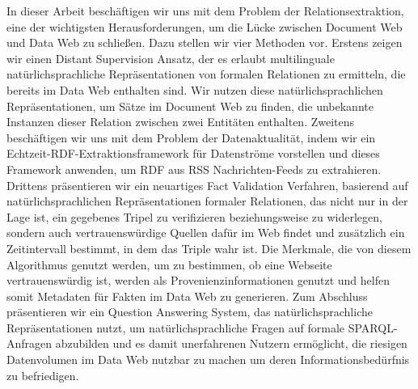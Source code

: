 In dieser Arbeit beschäftigen wir uns mit dem Problem der Relationsextraktion, eine der wichtigsten Herausforderungen, um die Lücke zwischen Document Web und Data Web zu schließen. 
Dazu stellen wir vier Methoden vor.
Erstens zeigen wir einen Distant Supervision Ansatz, der es erlaubt multilinguale natürlichsprachliche Repräsentationen von formalen Relationen zu ermitteln, die bereits im Data Web enthalten sind.
Wir nutzen diese natürlichsprachlichen Repräsentationen, um Sätze im Document Web zu finden, die unbekannte Instanzen dieser Relation zwischen zwei Entitäten enthalten.
Zweitens beschäftigen wir uns mit dem Problem der Datenaktualität, indem wir ein Echtzeit-RDF-Extraktionsframework für Datenströme vorstellen und dieses Framework anwenden, um RDF aus RSS Nachrichten-Feeds zu extrahieren.
Drittens präsentieren wir ein neuartiges Fact Validation Verfahren, basierend auf natürlichsprachlichen Repräsentationen formaler Relationen, das nicht nur in der Lage ist, ein gegebenes Tripel zu verifizieren beziehungsweise zu widerlegen, sondern auch vertrauenswürdige Quellen dafür im Web findet und zusätzlich ein Zeitintervall bestimmt, in dem das Triple wahr ist.
Die Merkmale, die von diesem Algorithmus genutzt werden, um zu bestimmen, ob eine Webseite vertrauenswürdig ist, werden als Provenienzinformationen genutzt und helfen somit Metadaten für Fakten im Data Web zu generieren. 
Zum Abschluss präsentieren wir ein Question Answering System, das natürlichsprachliche Repräsentationen nutzt, um natürlichsprachliche Fragen auf formale SPARQL-Anfragen abzubilden und es damit unerfahrenen Nutzern ermöglicht, die riesigen Datenvolumen im Data Web nutzbar zu machen um deren Informationsbedürfnis zu befriedigen.

\endgroup			

